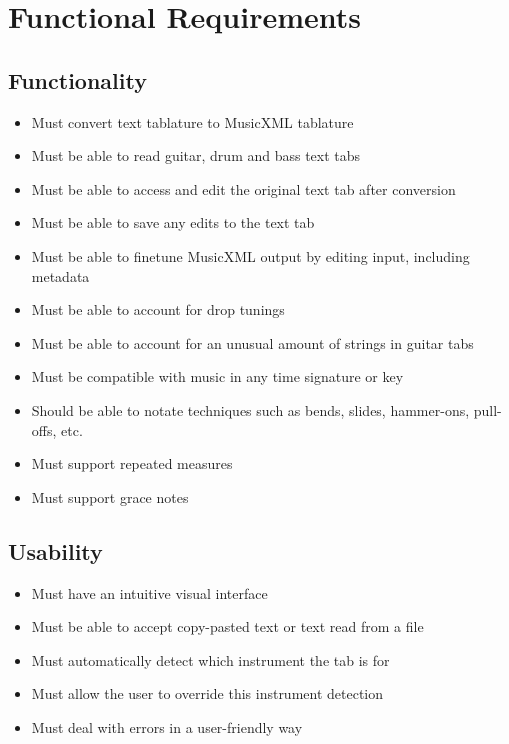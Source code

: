 \documentclass[11pt]{article}
\date{\today}
\title{}
\begin{document}
\tableofcontents

\newpage
\section{Functional Requirements}
\label{sec:orga44f78e}
\subsection{Functionality}
\label{sec:orgdfb599d}
\begin{itemize}
\item Must convert text tablature to MusicXML tablature
\item Must be able to read guitar, drum and bass text tabs
\item Must be able to access and edit the original text tab after conversion
\item Must be able to save any edits to the text tab
\item Must be able to finetune MusicXML output by editing input, including metadata
\item Must be able to account for drop tunings
\item Must be able to account for an unusual amount of strings in guitar tabs
\item Must be compatible with music in any time signature or key
\item Should be able to notate techniques such as bends, slides, hammer-ons, pull-offs, etc.
\item Must support repeated measures
\item Must support grace notes
\end{itemize}

\subsection{Usability}
\label{sec:orgb671d83}
\begin{itemize}
\item Must have an intuitive visual interface
\item Must be able to accept copy-pasted text or text read from a file
\item Must automatically detect which instrument the tab is for
\item Must allow the user to override this instrument detection
\item Must deal with errors in a user-friendly way
\end{itemize}
\end{document}
